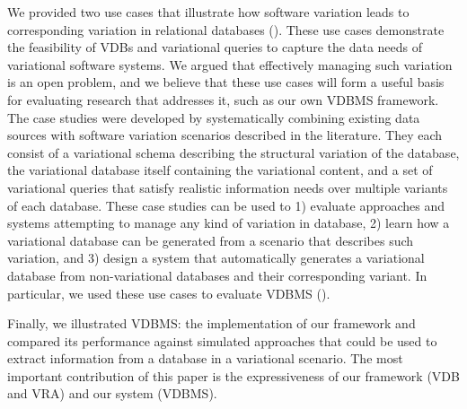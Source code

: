 We provided two use cases that illustrate how software variation leads to
corresponding variation in relational databases (). 
These use cases demonstrate
the feasibility of VDBs and variational queries to capture the data needs of variational
software systems.
%
We argued that effectively managing such variation is an open problem, and we
believe that these use cases will form a useful basis for evaluating
research that addresses it, such as our own VDBMS framework.
%
The case studies were developed by systematically combining existing data
sources with software variation scenarios described in the literature. They
each consist of a variational schema describing the structural variation of
the database, the variational database itself containing the variational
content, and a set of variational queries that satisfy realistic information
needs over multiple variants of each database.
% 
These case studies can be used to 1) evaluate approaches and systems
 attempting to manage any kind of variation in database, 2) learn how a
 variational database can be generated from a scenario that describes such
 variation, and 3) design a system that automatically generates a variational
 database from non-variational databases and their corresponding variant. In
 particular, we used these use cases to evaluate VDBMS (). 


Finally, we illustrated VDBMS: the implementation of our framework
and compared its performance against simulated approaches that
could be used to extract information from a database in a variational
scenario.
The most important contribution of this paper is the expressiveness of
our framework (VDB and VRA) and our system (VDBMS).


